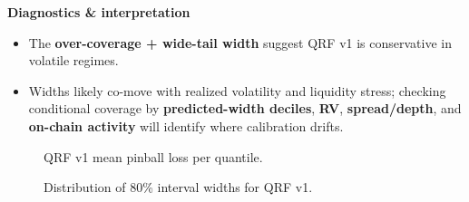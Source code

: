 \documentclass[
  a4paper,
  DIV=11,
  numbers=noendperiod]{scrreprt}
\providecommand{\tightlist}{%
  \setlength{\itemsep}{0pt}\setlength{\parskip}{0pt}}
\begin{document}
\textbf{Diagnostics \& interpretation}

\begin{itemize}
\tightlist
\item
  The \textbf{over-coverage + wide-tail width} suggest QRF v1 is
  conservative in volatile regimes.
\item
  Widths likely co-move with realized volatility and liquidity stress;
  checking conditional coverage by \textbf{predicted-width deciles},
  \textbf{RV}, \textbf{spread/depth}, and \textbf{on-chain activity}
  will identify where calibration drifts.
\end{itemize}

\begin{figure}


\caption{\label{fig-qrf-v1-pinball-mean}QRF v1 mean pinball loss per
quantile.}

\end{figure}%

\begin{figure}


\caption{\label{fig-qrf-interval-widths-80}Distribution of 80\% interval
widths for QRF v1.}

\end{figure}%
\end{document}
